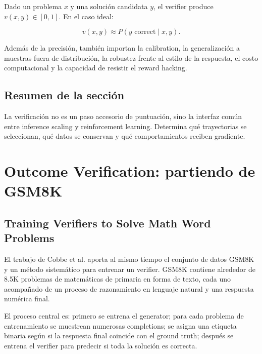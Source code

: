 \documentclass[a4paper]{article}
\begin{document}
Dado un problema $x$ y una solución candidata $y$, el verifier produce $v(x,y)\in[0,1]$. En el caso ideal:

$$
v(x,y)\approx P(y\text{ correct}\mid x,y).
$$

Además de la precisión, también importan la calibration, la generalización a muestras fuera de distribución, la robustez frente al estilo de la respuesta, el costo computacional y la capacidad de resistir el reward hacking.

\subsection{Resumen de la sección}

La verificación no es un paso accesorio de puntuación, sino la interfaz común entre inference scaling y reinforcement learning. Determina qué trayectorias se seleccionan, qué datos se conservan y qué comportamientos reciben gradiente.

\section{Outcome Verification: partiendo de GSM8K}

\subsection{Training Verifiers to Solve Math Word Problems}

El trabajo de Cobbe et al. aporta al mismo tiempo el conjunto de datos GSM8K y un método sistemático para entrenar un verifier. GSM8K contiene alrededor de 8.5K problemas de matemáticas de primaria en forma de texto, cada uno acompañado de un proceso de razonamiento en lenguaje natural y una respuesta numérica final.


El proceso central es: primero se entrena el generator; para cada problema de entrenamiento se muestrean numerosas completions; se asigna una etiqueta binaria según si la respuesta final coincide con el ground truth; después se entrena el verifier para predecir si toda la solución es correcta.

\end{document}
